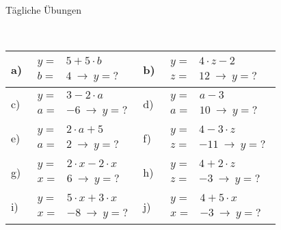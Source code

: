 \documentclass[12pt]{article}
\begin{document}
\centerline{{\Large Tägliche Übungen}} 
\vspace{1cm}
\noindent \\


\begin{xltabular}{\textwidth}{|C{0.75cm}|X|C{0.75cm}|X|}
\hline
a)&$\begin{aligned}
y=&5 + 5 \cdot b\\
 b=&4~ \rightarrow ~ y=?
\end{aligned}$
&
b)&$\begin{aligned}
y=&4 \cdot z - 2\\
 z=&12~ \rightarrow ~ y=?
\end{aligned}$
\\\hline
c)&$\begin{aligned}
y=&3 - 2 \cdot a\\
 a=&-6~ \rightarrow ~ y=?
\end{aligned}$
&
d)&$\begin{aligned}
y=&a - 3\\
 a=&10~ \rightarrow ~ y=?
\end{aligned}$
\\\hline
e)&$\begin{aligned}
y=&2 \cdot a + 5\\
 a=&2~ \rightarrow ~ y=?
\end{aligned}$
&
f)&$\begin{aligned}
y=&4 - 3 \cdot z\\
 z=&-11~ \rightarrow ~ y=?
\end{aligned}$
\\\hline
g)&$\begin{aligned}
y=&2 \cdot x - 2 \cdot x\\
 x=&6~ \rightarrow ~ y=?
\end{aligned}$
&
h)&$\begin{aligned}
y=&4 + 2 \cdot z\\
 z=&-3~ \rightarrow ~ y=?
\end{aligned}$
\\\hline
i)&$\begin{aligned}
y=&5 \cdot x + 3 \cdot x\\
 x=&-8~ \rightarrow ~ y=?
\end{aligned}$
&
j)&$\begin{aligned}
y=&4 + 5 \cdot x\\
 x=&-3~ \rightarrow ~ y=?
\end{aligned}$
\\\hline

\end{xltabular}
\end{document}
